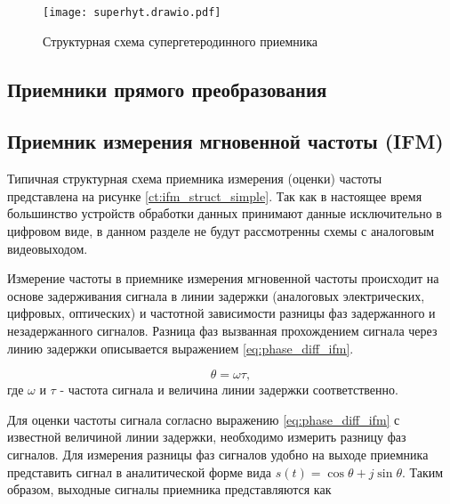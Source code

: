 \begin{figure}[ht]
	\centering
	\texttt{[image: superhyt.drawio.pdf]}	
	\caption{Структурная схема супергетеродинного приемника}
	\label{ct:superhyt}
\end{figure}

\subsection{Приемники прямого преобразования}

\subsection{Приемник измерения мгновенной частоты (IFM)}

Типичная структурная схема приемника измерения (оценки) частоты представлена на рисунке \ref{ct:ifm_struct_simple}. Так как в настоящее время большинство устройств обработки данных принимают данные исключительно в цифровом виде, в данном разделе не будут рассмотренны схемы с аналоговым видеовыходом.

%	

%	

Измерение частоты в приемнике измерения мгновенной частоты происходит на основе задерживания сигнала в линии задержки (аналоговых электрических, цифровых, оптических) и частотной зависимости разницы фаз задержанного и незадержанного сигналов. Разница фаз вызванная прохождением сигнала через линию задержки описывается выражением \eqref{eq:phase_diff_ifm}.

\begin{equation}
	\theta = \omega \tau ,
	\label{eq:phase_diff_ifm}
\end{equation}
где \(\omega\) и \(\tau\) - частота сигнала и величина линии задержки соответственно.

Для оценки частоты сигнала согласно выражению \eqref{eq:phase_diff_ifm} с известной величиной линии задержки, необходимо измерить разницу фаз сигналов. Для измерения разницы фаз сигналов удобно на выходе приемника представить сигнал в аналитической форме вида \( s(t) = \cos{\theta} + j \sin{\theta} \). Таким образом, выходные сигналы приемника представляются как

